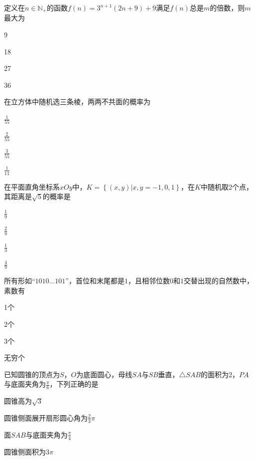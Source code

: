 \documentclass{exam-zh}
\begin{document}
\begin{question}
  定义在$n\in \mathbb N_+$的函数$f(n)=3^{n+1}(2n+9)+9$满足$f(n)$总是$m$的倍数，则$m$最大为 \paren

  \begin{choices}
    \item 9
    \item 18
    \item 27
    \item 36
  \end{choices}
\end{question}

\begin{question}
  在立方体中随机选三条棱，两两不共面的概率为 \paren

  \begin{choices}
    \item $\frac1{55}$
    \item $\frac2{55}$
    \item $\frac3{55}$
    \item $\frac1{11}$
  \end{choices}
\end{question}


\begin{question}
  在平面直角坐标系$xOy$中，$K=\left\{(x,y)|x,y=-1,0,1\right\}$，在$K$中随机取2个点，其距离是$\sqrt5$的概率是 \paren

  \begin{choices}
    \item $\frac19$
    \item $\frac29$
    \item $\frac13$
    \item $\frac49$
  \end{choices}
\end{question}

\begin{question}
  所有形如“$1010\dots101$”，首位和末尾都是$1$，且相邻位数$0$和$1$交替出现的自然数中，素数有 \paren

  \begin{choices}
    \item 1个
    \item 2个
    \item 3个
    \item 无穷个
  \end{choices}
\end{question}

\begin{question}
  已知圆锥的顶点为$S$，$O$为底面圆心，母线$SA$与$SB$垂直，$\triangle SAB$的面积为$2$，$PA$与底面夹角为$\frac\pi6$，下列正确的是 \paren

  \begin{choices}
    \item 圆锥高为$\sqrt3$
    \item 圆锥侧面展开扇形圆心角为$\frac23\pi$
    \item 面$SAB$与底面夹角为$\frac\pi4$
    \item 圆锥侧面积为$3\pi$
  \end{choices}
\end{question}
\end{document}
